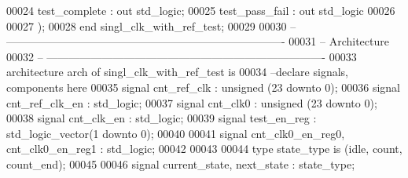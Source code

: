 \begin{DoxyCode}
00024           \textcolor{vhdlchar}{test_complete} \textcolor{vhdlchar}{:} \textcolor{keywordflow}{out} \textcolor{comment}{std\_logic};
00025           \textcolor{vhdlchar}{test_pass_fail}    \textcolor{vhdlchar}{:} \textcolor{keywordflow}{out} \textcolor{comment}{std\_logic}
00026      
00027         \textcolor{vhdlchar}{)};
00028 \textcolor{keywordflow}{end} \textcolor{vhdlchar}{singl\_clk\_with\_ref\_test};
00029 
00030 \textcolor{keyword}{-- ----------------------------------------------------------------------------}
00031 \textcolor{keyword}{-- Architecture}
00032 \textcolor{keyword}{-- ----------------------------------------------------------------------------}
00033 \textcolor{keywordflow}{architecture} arch \textcolor{keywordflow}{of} singl_clk_with_ref_test is
00034 \textcolor{keyword}{--declare signals,  components here}
00035 \textcolor{keywordflow}{signal} \textcolor{vhdlchar}{cnt_ref_clk}          \textcolor{vhdlchar}{:} \textcolor{comment}{unsigned} \textcolor{vhdlchar}{(}\textcolor{vhdllogic}{}\textcolor{vhdllogic}{23} \textcolor{keywordflow}{downto} \textcolor{vhdllogic}{}\textcolor{vhdllogic}{0}\textcolor{vhdlchar}{)};
00036 \textcolor{keywordflow}{signal} \textcolor{vhdlchar}{cnt_ref_clk_en}       \textcolor{vhdlchar}{:} \textcolor{comment}{std\_logic}; 
00037 \textcolor{keywordflow}{signal} \textcolor{vhdlchar}{cnt_clk0}             \textcolor{vhdlchar}{:} \textcolor{comment}{unsigned} \textcolor{vhdlchar}{(}\textcolor{vhdllogic}{}\textcolor{vhdllogic}{23} \textcolor{keywordflow}{downto} \textcolor{vhdllogic}{}\textcolor{vhdllogic}{0}\textcolor{vhdlchar}{)};
00038 \textcolor{keywordflow}{signal} \textcolor{vhdlchar}{cnt_clk_en}               \textcolor{vhdlchar}{:} \textcolor{comment}{std\_logic}; 
00039 \textcolor{keywordflow}{signal} \textcolor{vhdlchar}{test_en_reg}          \textcolor{vhdlchar}{:} \textcolor{comment}{std\_logic\_vector}\textcolor{vhdlchar}{(}\textcolor{vhdllogic}{}\textcolor{vhdllogic}{1} \textcolor{keywordflow}{downto} \textcolor{vhdllogic}{}\textcolor{vhdllogic}{0}\textcolor{vhdlchar}{)};
00040 
00041 \textcolor{keywordflow}{signal} \textcolor{vhdlchar}{cnt_clk0_en_reg0}\textcolor{vhdlchar}{,} \textcolor{vhdlchar}{cnt_clk0_en_reg1} \textcolor{vhdlchar}{:} \textcolor{comment}{std\_logic};
00042 
00043 
00044 \textcolor{keywordflow}{type} \textcolor{vhdlchar}{state_type} \textcolor{keywordflow}{is} \textcolor{vhdlchar}{(}\textcolor{vhdlchar}{idle}\textcolor{vhdlchar}{,} \textcolor{vhdlchar}{count}\textcolor{vhdlchar}{,} \textcolor{vhdlchar}{count\_end}\textcolor{vhdlchar}{)};
00045 
00046 \textcolor{keywordflow}{signal} \textcolor{vhdlchar}{current_state}\textcolor{vhdlchar}{,} \textcolor{vhdlchar}{next_state} \textcolor{vhdlchar}{:} \textcolor{vhdlchar}{state_type};

\end{DoxyCode}
